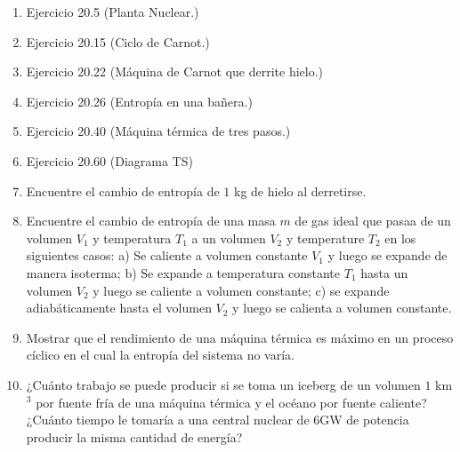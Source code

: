 \documentclass{article}
\begin{document}
\begin{enumerate}

\item
Ejercicio 20.5 (Planta Nuclear.)

\item
Ejercicio 20.15 (Ciclo de Carnot.)

\item 
Ejercicio 20.22 (Máquina de Carnot que derrite hielo.)

\item 
Ejercicio 20.26 (Entropía en una bañera.)

\item 
Ejercicio 20.40 (Máquina térmica de tres pasos.)

\item 
Ejercicio 20.60 (Diagrama TS)


\item
Encuentre el cambio de entropía de $1$ kg de hielo al derretirse.

\item
Encuentre el cambio de entropía de una masa $m$ de gas ideal que pasaa de un volumen $V_1$ y temperatura $T_1$ a un volumen $V_2$ y temperature $T_2$ en los siguientes casos: a) Se caliente a volumen constante $V_1$ y luego se expande de manera isoterma; b) Se expande a temperatura constante $T_1$ hasta un volumen $V_2$ y luego se caliente a volumen constante; c) se expande adiabáticamente hasta el volumen $V_2$ y luego se calienta a volumen constante.

\item
Mostrar que el rendimiento de una máquina térmica es máximo en un proceso cíclico en el cual la entropía del sistema no varía.

\item 
¿Cuánto trabajo se puede producir si se toma un iceberg de un volumen $1$ km$^3$ por fuente fría de una máquina térmica y el océano por fuente caliente? ¿Cuánto tiempo le tomaría a una central nuclear de 6GW de potencia producir la misma cantidad de energía?

\end{enumerate}
\end{document}
